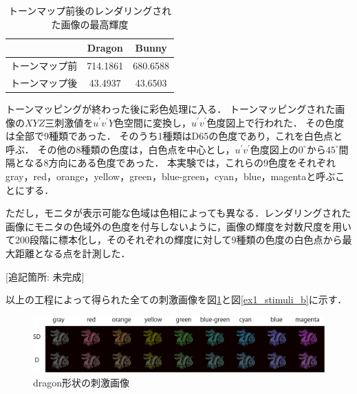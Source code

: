                 \begin{table}[h]
                    \centering
                    \caption{トーンマップ前後のレンダリングされた画像の最高輝度}
                    \begin{tabular}{|l||c|c|} \hline
                                               & Dragon              & Bunny              \\ \hline \hline
                        トーンマップ前         & 714.1861            & 680.6588           \\ \hline
                        トーンマップ後         & 43.4937             & 43.6503            \\ \hline
                    \end{tabular}
                    \label{tonemap}
                \end{table}

                トーンマッピングが終わった後に彩色処理に入る．
                トーンマッピングされた画像の$XYZ$三刺激値を$u^{\prime}v^{\prime}Y$色空間に変換し，$u^{\prime}v^{\prime}$色度図上で行われた．
                その色度は全部で9種類であった．
                そのうち1種類はD65の色度であり，これを白色点と呼ぶ．
                その他の8種類の色度は，白色点を中心とし，$u^{\prime}v^{\prime}$色度図上の$0^{\circ}$から$45^{\circ}$間隔となる8方向にある色度であった．
                本実験では，これらの9色度をそれぞれgray，red，orange，yellow，green，blue-green，cyan，blue，magentaと呼ぶことにする．

                ただし，モニタが表示可能な色域は色相によっても異なる．レンダリングされた画像にモニタの色域外の色度を付与しないように，画像の輝度を対数尺度を用いて200段階に標本化し，そのそれぞれの輝度に対して9種類の色度の白色点から最大距離となる点を計測した．

                [追記箇所: 未完成]

                
            以上の工程によって得られた全ての刺激画像を図\ref{ex1_stimuli_d}と図\ref{ex1_stimuli_b}に示す．

            \begin{figure}[h]
                \centering
                \includegraphics[width=14.0cm]{./img/ex1_stimuli_d_p.png}
                \caption{dragon形状の刺激画像}
                \label{ex1_stimuli_d}
            \end{figure}

